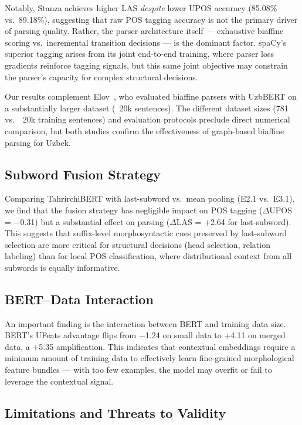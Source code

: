 \documentclass[10pt,conference,a4paper]{IEEEtran_EDM}
\begin{document}
Notably, Stanza achieves higher LAS \textit{despite} lower UPOS accuracy (85.08\% vs.\ 89.18\%), suggesting that raw POS tagging accuracy is not the primary driver of parsing quality. Rather, the parser architecture itself --- exhaustive biaffine scoring vs.\ incremental transition decisions --- is the dominant factor. spaCy's superior tagging arises from its joint end-to-end training, where parser loss gradients reinforce tagging signals, but this same joint objective may constrain the parser's capacity for complex structural decisions.

Our results complement Elov~\cite{elov2025methods}, who evaluated biaffine parsers with UzbBERT on a substantially larger dataset (~20k sentences). The different dataset sizes (781 vs.\ ~20k training sentences) and evaluation protocols preclude direct numerical comparison, but both studies confirm the effectiveness of graph-based biaffine parsing for Uzbek.

\subsection{Subword Fusion Strategy}

Comparing TahrirchiBERT with last-subword vs.\ mean pooling (E2.1 vs.\ E3.1), we find that the fusion strategy has negligible impact on POS tagging ($\Delta$UPOS = $-$0.31) but a substantial effect on parsing ($\Delta$LAS = +2.64 for last-subword). This suggests that suffix-level morphosyntactic cues preserved by last-subword selection are more critical for structural decisions (head selection, relation labeling) than for local POS classification, where distributional context from all subwords is equally informative.

\subsection{BERT--Data Interaction}

An important finding is the interaction between BERT and training data size. BERT's UFeats advantage flips from $-$1.24 on small data to +4.11 on merged data, a +5.35 amplification. This indicates that contextual embeddings require a minimum amount of training data to effectively learn fine-grained morphological feature bundles --- with too few examples, the model may overfit or fail to leverage the contextual signal.

\subsection{Limitations and Threats to Validity}
\label{sec:limitations}
\end{document}
